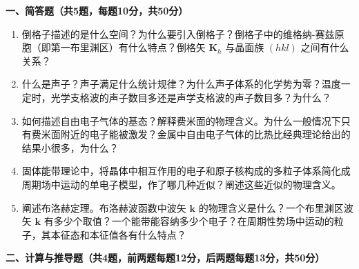 \documentclass[12pt,a4paper,fontset=mac]{ctexart}
\newcommand{\kk}{\mathbf{k}}
\newcommand{\shortanswer}{\vspace{5cm}}
\begin{document}
\vspace{0.5em}

\noindent\textbf{一、简答题（共5题，每题10分，共50分）}

\begin{enumerate}
\item 倒格子描述的是什么空间？为什么要引入倒格子？倒格子中的维格纳-赛兹原胞（即第一布里渊区）有什么特点？倒格矢 $\mathbf{K}_h$ 与晶面族 $(hkl)$ 之间有什么关系？
\shortanswer

\item 什么是声子？声子满足什么统计规律？为什么声子体系的化学势为零？温度一定时，光学支格波的声子数目多还是声学支格波的声子数目多？为什么？
\shortanswer

\item 如何描述自由电子气体的基态？解释费米面的物理含义。为什么一般情况下只有费米面附近的电子能被激发？金属中自由电子气体的比热比经典理论给出的结果小很多，为什么？
\shortanswer

\item 固体能带理论中，将晶体中相互作用的电子和原子核构成的多粒子体系简化成周期场中运动的单电子模型，作了哪几种近似？阐述这些近似的物理含义。
\shortanswer

\item 阐述布洛赫定理。布洛赫波函数中波矢 $\kk$ 的物理含义是什么？一个布里渊区波矢 $\kk$ 有多少个取值？一个能带能容纳多少个电子？在周期性势场中运动的粒子，其本征态和本征值各有什么特点？
\shortanswer

\end{enumerate}

\newpage

\noindent\textbf{二、计算与推导题（共4题，前两题每题12分，后两题每题13分，共50分）}
\end{document}
